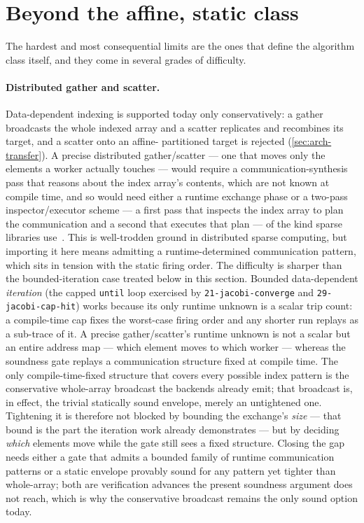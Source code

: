 \section{Beyond the affine, static class}\label{sec:fw-affine}

The hardest and most consequential limits are the ones that define the algorithm
class itself, and they come in several grades of difficulty.

\paragraph{Distributed gather and scatter.} Data-dependent indexing is supported
today only conservatively: a gather broadcasts the whole indexed array and a
scatter replicates and recombines its target, and a scatter onto an affine-
partitioned target is rejected (\cref{sec:arch-transfer}). A precise distributed
gather/scatter --- one that moves only the elements a worker actually touches ---
would require a communication-synthesis pass that reasons about the index array's
contents, which are not known at compile time, and so would need either a runtime
exchange phase or a two-pass inspector/executor scheme --- a first pass that
inspects the index array to plan the communication and a second that executes that
plan --- of the kind sparse libraries use~\cite{saltz1991runtime}. This is well-trodden ground in distributed sparse computing, but importing it
here means admitting a runtime-determined communication pattern, which sits in
tension with the static firing order. The difficulty is sharper than the
bounded-iteration case treated below in this section. Bounded data-dependent
\emph{iteration} (the capped \texttt{until} loop exercised by
\texttt{21-jacobi-converge} and \texttt{29-jacobi-cap-hit}) works because its only
runtime unknown is a scalar trip count: a compile-time cap fixes the worst-case
firing order and any shorter run replays as a sub-trace of it. A precise
gather/scatter's runtime unknown is not a scalar but an entire address map --- which
element moves to which worker --- whereas the soundness gate replays a communication
structure fixed at compile time. The only compile-time-fixed structure that covers
every possible index pattern is the conservative whole-array broadcast the backends
already emit; that broadcast is, in effect, the trivial statically sound envelope,
merely an untightened one. Tightening it is therefore not blocked by bounding the
exchange's \emph{size} --- that bound is the part the iteration work already
demonstrates --- but by deciding \emph{which} elements move while the gate still sees
a fixed structure. Closing the gap needs either a gate that admits a bounded family
of runtime communication patterns or a static envelope provably sound for any pattern
yet tighter than whole-array; both are verification advances the present soundness
argument does not reach, which is why the conservative broadcast remains the only
sound option today.

